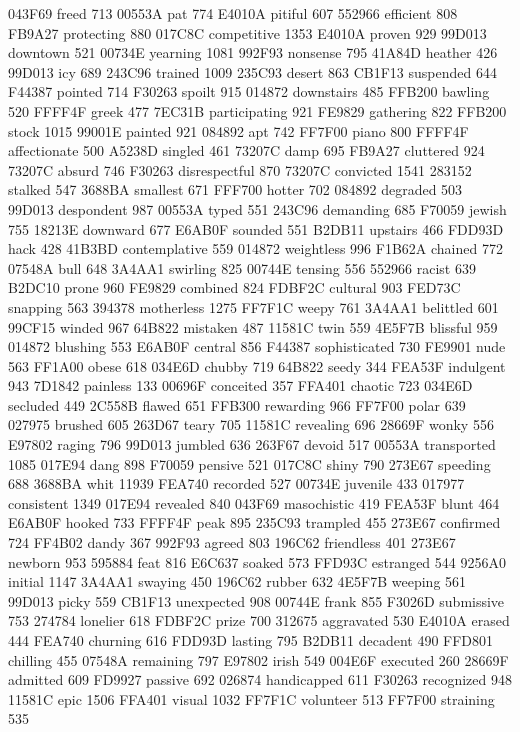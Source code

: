 043F69 freed 713 00553A pat 774 E4010A pitiful 607 552966 efficient 808
FB9A27 protecting 880 017C8C competitive 1353 E4010A proven 929 99D013
downtown 521 00734E yearning 1081 992F93 nonsense 795 41A84D heather
426 99D013 icy 689 243C96 trained 1009 235C93 desert 863 CB1F13
suspended 644 F44387 pointed 714 F30263 spoilt 915 014872 downstairs
485 FFB200 bawling 520 FFFF4F greek 477 7EC31B participating 921 FE9829
gathering 822 FFB200 stock 1015 99001E painted 921 084892 apt 742
FF7F00 piano 800 FFFF4F affectionate 500 A5238D singled 461 73207C damp
695 FB9A27 cluttered 924 73207C absurd 746 F30263 disrespectful 870
73207C convicted 1541 283152 stalked 547 3688BA smallest 671 FFF700
hotter 702 084892 degraded 503 99D013 despondent 987 00553A typed 551
243C96 demanding 685 F70059 jewish 755 18213E downward 677 E6AB0F
sounded 551 B2DB11 upstairs 466 FDD93D hack 428 41B3BD contemplative
559 014872 weightless 996 F1B62A chained 772 07548A bull 648 3A4AA1
swirling 825 00744E tensing 556 552966 racist 639 B2DC10 prone 960
FE9829 combined 824 FDBF2C cultural 903 FED73C snapping 563 394378
motherless 1275 FF7F1C weepy 761 3A4AA1 belittled 601 99CF15 winded 967
64B822 mistaken 487 11581C twin 559 4E5F7B blissful 959 014872 blushing
553 E6AB0F central 856 F44387 sophisticated 730 FE9901 nude 563 FF1A00
obese 618 034E6D chubby 719 64B822 seedy 344 FEA53F indulgent 943
7D1842 painless 133 00696F conceited 357 FFA401 chaotic 723 034E6D
secluded 449 2C558B flawed 651 FFB300 rewarding 966 FF7F00 polar 639
027975 brushed 605 263D67 teary 705 11581C revealing 696 28669F wonky
556 E97802 raging 796 99D013 jumbled 636 263F67 devoid 517 00553A
transported 1085 017E94 dang 898 F70059 pensive 521 017C8C shiny 790
273E67 speeding 688 3688BA whit 11939 FEA740 recorded 527 00734E
juvenile 433 017977 consistent 1349 017E94 revealed 840 043F69
masochistic 419 FEA53F blunt 464 E6AB0F hooked 733 FFFF4F peak 895
235C93 trampled 455 273E67 confirmed 724 FF4B02 dandy 367 992F93 agreed
803 196C62 friendless 401 273E67 newborn 953 595884 feat 816 E6C637
soaked 573 FFD93C estranged 544 9256A0 initial 1147 3A4AA1 swaying 450
196C62 rubber 632 4E5F7B weeping 561 99D013 picky 559 CB1F13 unexpected
908 00744E frank 855 F3026D submissive 753 274784 lonelier 618 FDBF2C
prize 700 312675 aggravated 530 E4010A erased 444 FEA740 churning 616
FDD93D lasting 795 B2DB11 decadent 490 FFD801 chilling 455 07548A
remaining 797 E97802 irish 549 004E6F executed 260 28669F admitted 609
FD9927 passive 692 026874 handicapped 611 F30263 recognized 948 11581C
epic 1506 FFA401 visual 1032 FF7F1C volunteer 513 FF7F00 straining 535
